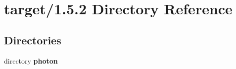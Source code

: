 \section{target/1.5.2 Directory Reference}
\label{dir_339fadaca7f52c99a94ed798e1d13607}
\subsection*{Directories}
\begin{DoxyCompactItemize}
\item 
directory \textbf{ photon}
\end{DoxyCompactItemize}
